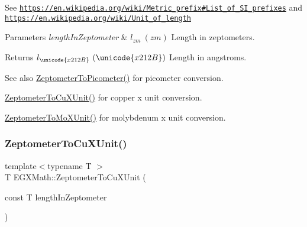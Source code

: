 See \href{https://en.wikipedia.org/wiki/Metric_prefix#List_of_SI_prefixes}{\tt https\+://en.\+wikipedia.\+org/wiki/\+Metric\+\_\+prefix\#\+List\+\_\+of\+\_\+\+S\+I\+\_\+prefixes} and \href{https://en.wikipedia.org/wiki/Unit_of_length}{\tt https\+://en.\+wikipedia.\+org/wiki/\+Unit\+\_\+of\+\_\+length} 
\begin{DoxyParams}{Parameters}
{\em length\+In\+Zeptometer} & $ l_{zm}\ (zm)$ Length in zeptometers. \\
\hline
\end{DoxyParams}
\begin{DoxyReturn}{Returns}
$ l_{\unicode{x212B}}\ (\unicode{x212B})$ Length in angstroms. 
\end{DoxyReturn}
\begin{DoxySeeAlso}{See also}
\mbox{\hyperlink{group___e_g_x_math-_conversions-_length_conversions-_zeptometer-_s_i_gae7409493227692a85b7fa5016a007de3}{Zeptometer\+To\+Picometer()}} for picometer conversion. 

\mbox{\hyperlink{group___e_g_x_math-_conversions-_length_conversions-_zeptometer-_non-_s_i_gaeeff3d1ea7d8cd0c703419ce16fcadd7}{Zeptometer\+To\+Cu\+X\+Unit()}} for copper x unit conversion. 

\mbox{\hyperlink{group___e_g_x_math-_conversions-_length_conversions-_zeptometer-_non-_s_i_gaa621a874847d7e6aae8d04395c68a313}{Zeptometer\+To\+Mo\+X\+Unit()}} for molybdenum x unit conversion. 
\end{DoxySeeAlso}
\mbox{\label{group___e_g_x_math-_conversions-_length_conversions-_zeptometer-_non-_s_i_gaeeff3d1ea7d8cd0c703419ce16fcadd7}} 
\subsubsection{\texorpdfstring{Zeptometer\+To\+Cu\+X\+Unit()}{ZeptometerToCuXUnit()}}
{\footnotesize\ttfamily template$<$typename T $>$ \\
T E\+G\+X\+Math\+::\+Zeptometer\+To\+Cu\+X\+Unit (\begin{DoxyParamCaption}\item[{const T}]{length\+In\+Zeptometer }\end{DoxyParamCaption})}



